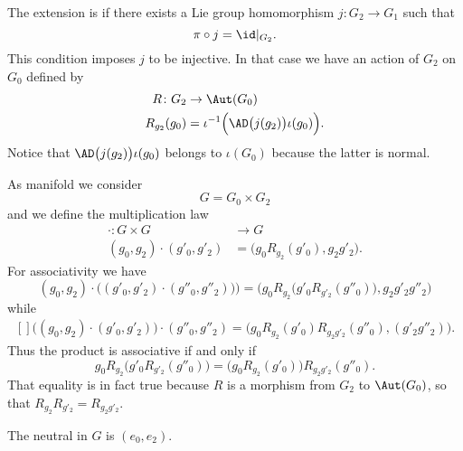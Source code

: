 The extension is  if there exists a Lie group homomorphism  $j\colon G_2\to G_1$ such that
\begin{equation}
	\pi\circ j=\id|_{G_2}.
\end{equation}
This condition imposes $j$ to be injective. In that case we have an action of $G_2$ on $G_0$ defined by
\begin{equation}
	\begin{aligned}
		R\colon G_2  & \to \Aut(G_0)                                           \\
		R_{g_2}(g_0) & =\iota^{-1}\Big( \AD\big( j(g_2) \big)\iota(g_0) \Big).
	\end{aligned}
\end{equation}
Notice that $\AD\big(j(g_2)\big)\iota(g_0)$ belongs to $\iota(G_0)$ because the latter is normal.

As manifold we consider
\begin{equation}
	G=G_0\times G_2
\end{equation}
and we define the multiplication law
\begin{equation}
	\begin{aligned}
		\cdot\colon G\times G     & \to G                                   \\
		(g_0,g_2)\cdot(g'_0,g'_2) & =\big( g_0 R_{g_2}(g'_0),g_2g'_2 \big).
	\end{aligned}
\end{equation}
For associativity we have
\begin{equation}
	(g_0,g_2)\cdot\big( (g'_0,g'_2)\cdot (g''_0,g''_2)) \big)=\Big(  g_0R_{g_2}\big( g'_0R_{g'_2}(g''_0) \big),g_2g'_2g''_2  \Big)
\end{equation}
while
\begin{equation}
	\begin{aligned}[]
		\big( (g_0,g_2)\cdot(g'_0,g'_2) \big)\cdot(g''_0,g''_2)=\big( g_0R_{g_2}(g'_0)R_{g_2g'_2}(g''_0),(g'_2g''_2) \big).
	\end{aligned}
\end{equation}
Thus the product is associative if and only if
\begin{equation}
	g_0R_{g_2}\big( g'_0R_{g'_2}(g''_0) \big)=\big( g_0R_{g_2}(g'_0) \big)R_{g_2g'_2}(g''_0).
\end{equation}
That equality is in fact true because $R$ is a morphism from $G_2$ to $\Aut(G_0)$, so that $R_{g_2}R_{g'_2}=R_{g_2g'_2}$.

The neutral in $G$ is $(e_0,e_2)$.

